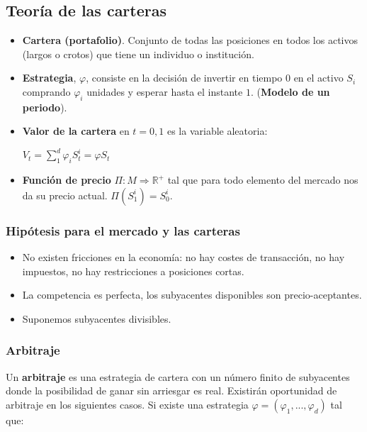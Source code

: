 \documentclass[
10pt, %
a4paper, %
oneside, %
headinclude,footinclude, %
BCOR5mm, %
]{scrartcl}
\newcommand{\n}[1]{\textbf{#1}}
\newcommand{\sub}[1]{_{#1}}
\newcommand{\pot}[1]{^{#1}}
\newcommand{\f}[1]{{\large{${#1}$}}}
\newcommand{\sumatorio}[2]{\sum_{#1}^{#2}}
\newcommand{\ent}[0]{\Rightarrow}
\newcommand{\rn}[1]{\mathbb{R}\pot{#1}}
\newcounter{ex}
\begin{document}
	\subsection{Teoría de las carteras}

		\begin{itemize}
			\item \n{Cartera (portafolio)}. Conjunto de todas las posiciones en todos los activos (largos o crotos) que tiene un individuo o institución.
			\item \n{Estrategia}, \f{\varphi}, consiste en la decisión de invertir en tiempo 0 en el activo \f{S\sub{i}} comprando \f{\varphi\sub{i}} unidades y esperar hasta el instante \f{1}. (\n{Modelo de un periodo}).
			\item \n{Valor de la cartera} en \f{t = 0,1} es la variable aleatoria:
			\begin{center} \f{V\sub{t} = \sumatorio{1}{d} \varphi\sub{i}S\sub{t}\pot{i} = \varphi S\sub{t}} \end{center}
			\item \n{Función de precio} \f{\Pi: M \ent \rn{+}} tal que para todo elemento del mercado nos da su precio actual. \f{\Pi(S\pot{i}\sub{1}) = S\sub{0}\pot{i}}.
		\end{itemize}

		\subsubsection{Hipótesis para el mercado y las carteras}

			\begin{itemize}
				\item No existen fricciones en la economía: no hay costes de transacción, no hay impuestos, no hay restricciones a posiciones cortas. 
				\item La competencia es perfecta, los subyacentes disponibles son precio-aceptantes. 
				\item Suponemos subyacentes divisibles.

			\end{itemize}

			\newpage

	\subsubsection{Arbitraje}

		Un \n{arbitraje} es una estrategia de cartera con un número finito de subyacentes donde la posibilidad de ganar sin arriesgar es real. Existirán oportunidad de arbitraje en los siguientes casos. Si existe una estrategia \f{\varphi = (\varphi\sub{1},...,\varphi\sub{d})} tal que:
\end{document}
